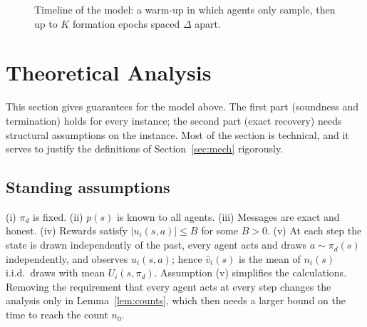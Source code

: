 \documentclass[11pt]{article}
\theoremstyle{plain}
\theoremstyle{definition}
\theoremstyle{remark}
\begin{document}
\begin{figure}[h]
\centering
{}
\caption{Timeline of the model: a warm-up in which agents only sample, then up to $K$ formation epochs spaced $\Delta$ apart.}
\label{fig:timeline}
\end{figure}
 
\section{Theoretical Analysis}\label{sec:analysis}
This section gives guarantees for the model above. The first part (soundness and termination) holds for every instance; the second part (exact recovery) needs structural assumptions on the instance.
Most of the section is technical, and it serves to justify the definitions of Section~\ref{sec:mech} rigorously.
 
\subsection{Standing assumptions}
(i) $\pi_d$ is fixed. (ii) $p(s)$ is known to all agents. (iii) Messages are exact and honest. (iv) Rewards satisfy $|u_i(s,a)|\le B$ for some $B>0$.
(v) At each step the state is drawn independently of the past, every agent acts and draws $a\sim\pi_d(s)$ independently, and observes $u_i(s,a)$;
hence $\hat v_i(s)$ is the mean of $n_i(s)$ i.i.d.\ draws with mean $U_i(s,\pi_d)$.
Assumption (v) simplifies the calculations. Removing the requirement that every agent acts at every step changes the analysis only in Lemma~\ref{lem:counts}, which then needs a larger bound on the time to reach the count $n_0$.
 
\end{document}

